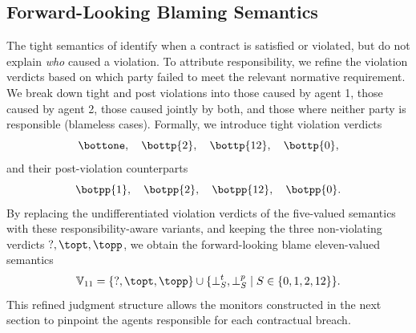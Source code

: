\subsection{Forward-Looking Blaming Semantics}
The tight semantics of \cDL identify when a contract is satisfied or violated, but do not explain \emph{who} caused a violation.  
To attribute responsibility, we refine the violation verdicts based on which party failed to meet the relevant normative requirement.  
We break down tight and post violations into those caused by agent 1, those caused by agent 2, those caused jointly by both, and those where neither party is responsible (blameless cases).  
Formally, we introduce tight violation verdicts
\[
\bottone,\quad \bottp{2},\quad \bottp{12},\quad \bottp{0},
\]
and their post-violation counterparts
\[
\botpp{1},\quad \botpp{2},\quad \botpp{12},\quad \botpp{0}.
\]
By replacing the undifferentiated violation verdicts of the five-valued semantics with these responsibility-aware variants, and keeping the three non-violating verdicts \(\mathsf{?},\topt,\topp\), we obtain the forward-looking blame eleven-valued semantics
\[
\mathbb{V}_{11}
    = \{\mathsf{?},\topt,\topp\}
      \cup \{\bot^{t}_{S},\bot^{p}_{S}\mid S\in\{0,1,2,12\}\}.
\]
This refined judgment structure allows the monitors constructed in the next section to pinpoint the agents responsible for each contractual breach.


